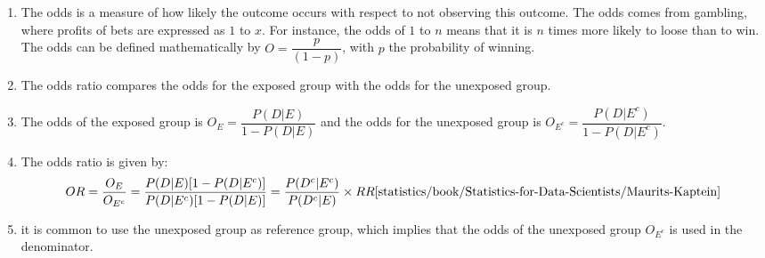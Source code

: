 \begin{enumerate}
    \item  
    \begin{definition}[Odds]    
        The odds is a measure of how likely the outcome occurs with respect to not observing this outcome.
        The odds comes from gambling, where profits of bets are expressed as $1$ to $x$. 
        For instance, the odds of $1$ to $n$ means that it is $n$ times more likely to loose than to win.
        The odds can be defined mathematically by $O = \dfrac{p}{(1 - p)}$, with $p$ the probability of winning.
        \hfill \cite{statistics/book/Statistics-for-Data-Scientists/Maurits-Kaptein}
    \end{definition}

    \item The odds ratio compares the odds for the exposed group with the odds for the unexposed group.
    \hfill \cite{statistics/book/Statistics-for-Data-Scientists/Maurits-Kaptein}

    \item The odds of the exposed group is $O_E = \dfrac{P (D|E)}{1 - P (D|E)}$ and the odds for the unexposed group is $O_{E^c} = \dfrac{P (D|E^c)}{1 - P (D|E^c)}$. 
    \hfill \cite{statistics/book/Statistics-for-Data-Scientists/Maurits-Kaptein}

    \item The odds ratio is given by:
    \[
        OR 
        = \dfrac{O_E}{O_{E^c}} 
        = \dfrac{P (D|E)[1 - P (D|E^c)]}{P (D|E^c)[1 - P (D|E)] }
        = \dfrac{P (D^c|E^c)}{P (D^c|E)} \times RR
        \hfill \text{\cite{statistics/book/Statistics-for-Data-Scientists/Maurits-Kaptein}}
    \]

    \item  it is common to use the unexposed group as reference group, which implies that the odds of the unexposed group $O_{E^c}$ is used in the denominator.
\end{enumerate}


